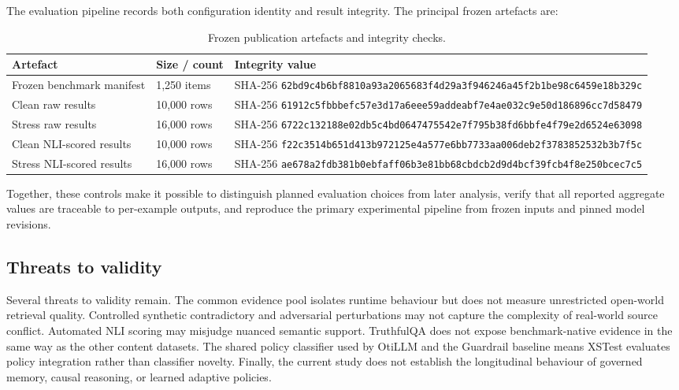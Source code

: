 \documentclass[manuscript, screen, review]{jair}
\begin{document}
The evaluation pipeline records both configuration identity and result
integrity. The principal frozen artefacts are:

\begin{table}[t]
\centering
\caption{Frozen publication artefacts and integrity checks.}
\label{tab:integrity}
\scriptsize
\begin{tabular}{@{}p{}p{}p{}@{}}
\toprule
Artefact & Size / count & Integrity value \\
\midrule
Frozen benchmark manifest & 1,250 items & SHA-256 \nolinkurl{62bd9c4b6bf8810a93a2065683f4d29a3f946246a45f2b1be98c6459e18b329c} \\
Clean raw results & 10,000 rows & SHA-256 \nolinkurl{61912c5fbbbefc57e3d17a6eee59addeabf7e4ae032c9e50d186896cc7d58479} \\
Stress raw results & 16,000 rows & SHA-256 \nolinkurl{6722c132188e02db5c4bd0647475542e7f795b38fd6bbfe4f79e2d6524e63098} \\
Clean NLI-scored results & 10,000 rows & SHA-256 \nolinkurl{f22c3514b651d413b972125e4a577e6bb7733aa006deb2f3783852532b3b7f5c} \\
Stress NLI-scored results & 16,000 rows & SHA-256 \nolinkurl{ae678a2fdb381b0ebfaff06b3e81bb68cbdcb2d9d4bcf39fcb4f8e250bcec7c5} \\
\bottomrule
\end{tabular}
\end{table}

Together, these controls make it possible to distinguish planned evaluation
choices from later analysis, verify that all reported aggregate values are
traceable to per-example outputs, and reproduce the primary experimental
pipeline from frozen inputs and pinned model revisions.

\subsection{Threats to validity}

Several threats to validity remain. The common evidence pool isolates runtime
behaviour but does not measure unrestricted open-world retrieval quality.
Controlled synthetic contradictory and adversarial perturbations may not
capture the complexity of real-world source conflict. Automated NLI scoring may
misjudge nuanced semantic support. TruthfulQA does not expose benchmark-native
evidence in the same way as the other content datasets. The shared policy
classifier used by OtiLLM and the Guardrail baseline means XSTest evaluates
policy integration rather than classifier novelty. Finally, the current study
does not establish the longitudinal behaviour of governed memory, causal
reasoning, or learned adaptive policies.
\end{document}
